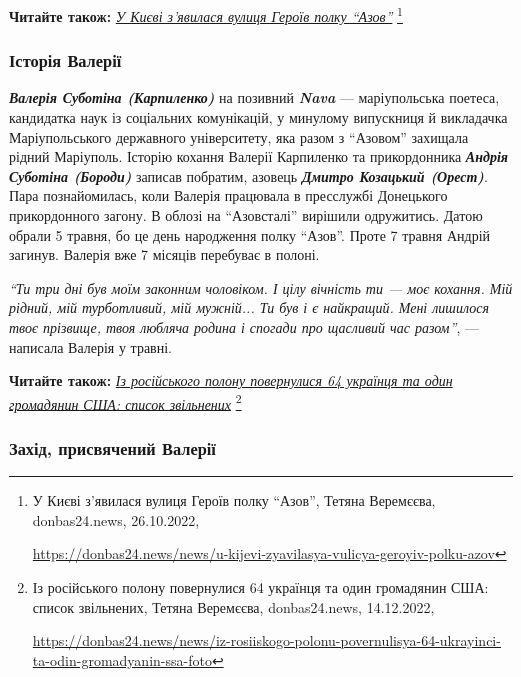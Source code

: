 \textbf{Читайте також:} \href{https://donbas24.news/news/u-kijevi-zyavilasya-vulicya-geroyiv-polku-azov}{\emph{У Києві з’явилася вулиця Героїв полку \enquote{Азов}}}%
\footnote{У Києві з'явилася вулиця Героїв полку \enquote{Азов}, Тетяна Веремєєва, donbas24.news, 26.10.2022, \par%
\url{https://donbas24.news/news/u-kijevi-zyavilasya-vulicya-geroyiv-polku-azov}%
}

\subsubsection{Історія Валерії}

\emph{\textbf{Валерія Суботіна (Карпиленко)}} на позивний \emph{\textbf{Nava}} — маріупольська поетеса,
кандидатка наук із соціальних комунікацій, у минулому випускниця й викладачка
Маріупольського державного університету, яка разом з \enquote{Азовом} захищала рідний
Маріуполь. Історію кохання Валерії Карпиленко та прикордонника \emph{\textbf{Андрія Суботіна
(Бороди)}} записав побратим, азовець \emph{\textbf{Дмитро Козацький (Орест)}}. Пара
познайомилась, коли Валерія працювала в пресслужбі Донецького прикордонного
загону. В облозі на \enquote{Азовсталі} вирішили одружитись. Датою обрали 5 травня, бо
це день народження полку \enquote{Азов}. Проте 7 травня Андрій загинув. Валерія вже 7
місяців перебуває в полоні.

\begin{leftbar}
\emph{\enquote{Ти три дні був моїм законним чоловіком. І цілу вічність ти — моє кохання. Мій
рідний, мій турботливий, мій мужній... Ти був і є найкращий. Мені
лишилося твоє прізвище, твоя любляча родина і спогади про щасливий час
разом}}, — написала Валерія у травні.
\end{leftbar}

\textbf{Читайте також:} \href{https://donbas24.news/news/iz-rosiiskogo-polonu-povernulisya-64-ukrayinci-ta-odin-gromadyanin-ssa-foto}{\emph{Із російського полону повернулися 64 українця та один громадянин США: список звільнених}}%
\footnote{Із російського полону повернулися 64 українця та один громадянин США: список звільнених, Тетяна Веремєєва, donbas24.news, 14.12.2022, \par%
\url{https://donbas24.news/news/iz-rosiiskogo-polonu-povernulisya-64-ukrayinci-ta-odin-gromadyanin-ssa-foto}%
}


\subsubsection{Захід, присвячений Валерії}

